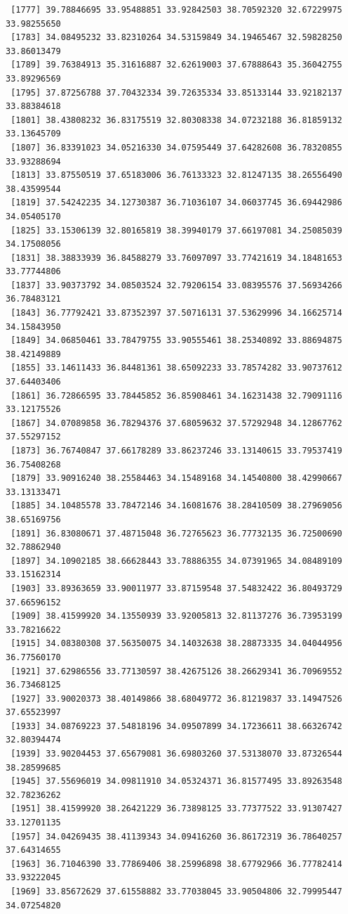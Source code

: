 \documentclass[
  letterpaper,
  DIV=11,
  numbers=noendperiod]{scrartcl}
\begin{document}
\begin{verbatim}
 [1777] 39.78846695 33.95488851 33.92842503 38.70592320 32.67229975 33.98255650
 [1783] 34.08495232 33.82310264 34.53159849 34.19465467 32.59828250 33.86013479
 [1789] 39.76384913 35.31616887 32.62619003 37.67888643 35.36042755 33.89296569
 [1795] 37.87256788 37.70432334 39.72635334 33.85133144 33.92182137 33.88384618
 [1801] 38.43808232 36.83175519 32.80308338 34.07232188 36.81859132 33.13645709
 [1807] 36.83391023 34.05216330 34.07595449 37.64282608 36.78320855 33.93288694
 [1813] 33.87550519 37.65183006 36.76133323 32.81247135 38.26556490 38.43599544
 [1819] 37.54242235 34.12730387 36.71036107 34.06037745 36.69442986 34.05405170
 [1825] 33.15306139 32.80165819 38.39940179 37.66197081 34.25085039 34.17508056
 [1831] 38.38833939 36.84588279 33.76097097 33.77421619 34.18481653 33.77744806
 [1837] 33.90373792 34.08503524 32.79206154 33.08395576 37.56934266 36.78483121
 [1843] 36.77792421 33.87352397 37.50716131 37.53629996 34.16625714 34.15843950
 [1849] 34.06850461 33.78479755 33.90555461 38.25340892 33.88694875 38.42149889
 [1855] 33.14611433 36.84481361 38.65092233 33.78574282 33.90737612 37.64403406
 [1861] 36.72866595 33.78445852 36.85908461 34.16231438 32.79091116 33.12175526
 [1867] 34.07089858 36.78294376 37.68059632 37.57292948 34.12867762 37.55297152
 [1873] 36.76740847 37.66178289 33.86237246 33.13140615 33.79537419 36.75408268
 [1879] 33.90916240 38.25584463 34.15489168 34.14540800 38.42990667 33.13133471
 [1885] 34.10485578 33.78472146 34.16081676 38.28410509 38.27969056 38.65169756
 [1891] 36.83080671 37.48715048 36.72765623 36.77732135 36.72500690 32.78862940
 [1897] 34.10902185 38.66628443 33.78886355 34.07391965 34.08489109 33.15162314
 [1903] 33.89363659 33.90011977 33.87159548 37.54832422 36.80493729 37.66596152
 [1909] 38.41599920 34.13550939 33.92005813 32.81137276 36.73953199 33.78216622
 [1915] 34.08380308 37.56350075 34.14032638 38.28873335 34.04044956 36.77560170
 [1921] 37.62986556 33.77130597 38.42675126 38.26629341 36.70969552 36.73468125
 [1927] 33.90020373 38.40149866 38.68049772 36.81219837 33.14947526 37.65523997
 [1933] 34.08769223 37.54818196 34.09507899 34.17236611 38.66326742 32.80394474
 [1939] 33.90204453 37.65679081 36.69803260 37.53138070 33.87326544 38.28599685
 [1945] 37.55696019 34.09811910 34.05324371 36.81577495 33.89263548 32.78236262
 [1951] 38.41599920 38.26421229 36.73898125 33.77377522 33.91307427 33.12701135
 [1957] 34.04269435 38.41139343 34.09416260 36.86172319 36.78640257 37.64314655
 [1963] 36.71046390 33.77869406 38.25996898 38.67792966 36.77782414 33.93222045
 [1969] 33.85672629 37.61558882 33.77038045 33.90504806 32.79995447 34.07254820

\end{verbatim}
\end{document}
